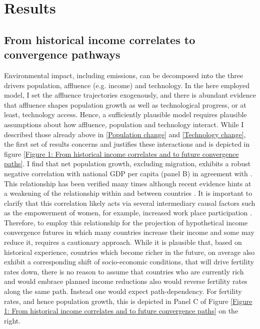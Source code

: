 \documentclass{article}
\begin{document}
\section{Results}

\subsection{From historical income correlates to convergence pathways}

Environmental impact, including emissions, can be decomposed into the three drivers population, affluence (e.g. income) and technology. In the here employed model, I set the affluence trajectories exogenously, and there is abundant evidence that affluence shapes population growth as well as technological progress, or at least, technology access. Hence, a sufficiently plausible model requires plausible assumptions about how affluence, population and technology interact. While I described those already above in \ref{Population change} and \ref{Technology change}, the first set of results concerns and justifies these interactions and is depicted in figure \ref{Figure 1: From historical income correlates and to future convergence paths}. I find that net population growth, excluding migration, exhibits a robust negative correlation with national GDP per capita (panel B) in agreement with \textcite{murphy2021energy}. This relationship has been verified many times although recent evidence hints at a weakening of the relationship within and between countries \parencite{doepke2023economics}. It is important to clarify that this correlation likely acts via several intermediary causal factors such as the empowerment of women, for example, increased work place participation  \parencite{owid-fertility-rate}. Therefore, to employ this relationship for the projection of hypothetical income convergence futures in which many countries increase their income and some may reduce it, requires a cautionary approach. While it is plausible that, based on historical experience, countries which become richer in the future, on average also exhibit a corresponding shift of socio-economic conditions, that will drive fertility rates down, there is no reason to assume that countries who are currently rich and would embrace planned income reductions also would reverse fertility rates along the same path. Instead one would expect path-dependency. For fertility rates, and hence population growth, this is depicted in Panel C of Figure \ref{Figure 1: From historical income correlates and to future convergence paths} on the right. 
\end{document}
